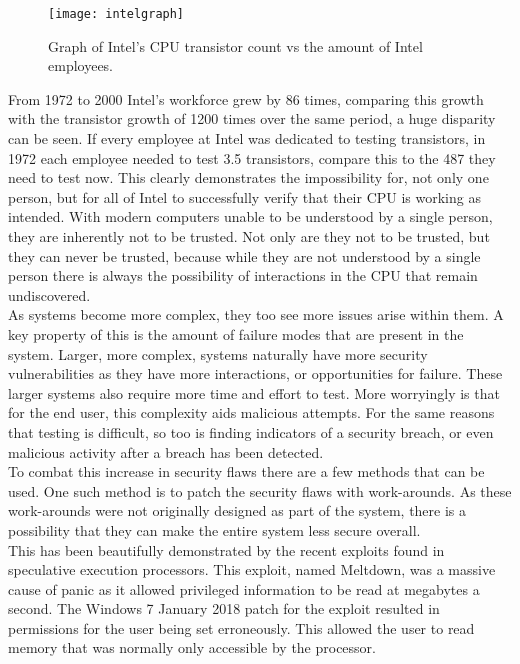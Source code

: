 \begin{figure}
  \centering
  \texttt{[image: intelgraph]}
  \caption{Graph of Intel's CPU transistor count vs the amount of Intel employees.\\ \cite{Reference28}\cite{Reference29}\cite{Reference30}\cite{Reference31}\cite{Reference32}\cite{Reference33}\cite{Reference34}\cite{Reference35}
}
  \label{fig:intelgraph}
\end{figure}

From 1972 to 2000 Intel’s workforce grew by 86 times, comparing this growth with the transistor growth of 1200 times over the same period, a huge disparity can be seen. If every employee at Intel was dedicated to testing transistors, in 1972 each employee needed to test 3.5 transistors, compare this to the 487 they need to test now. This clearly demonstrates the impossibility for, not only one person, but for all of Intel to successfully verify that their CPU is working as intended. With modern computers unable to be understood by a single person, they are inherently not to be trusted.\cite{Reference4} Not only are they not to be trusted, but they can never be trusted, because while they are not understood by a single person there is always the possibility of interactions in the CPU that remain undiscovered.\cite{Reference5}\\
 As systems become more complex, they too see more issues arise within them. A key property of this is the amount of failure modes that are present in the system. Larger, more complex, systems naturally have more security vulnerabilities as they have more interactions, or opportunities for failure.\cite{Reference6} These larger systems also require more time and effort to test. More worryingly is that for the end user, this complexity aids malicious attempts.\cite{Reference7} For the same reasons that testing is difficult, so too is finding indicators of a security breach, or even malicious activity after a breach has been detected.\cite{Reference8}\\
To combat this increase in security flaws there are a few methods that can be used. One such method is to patch the security flaws with work-arounds. As these work-arounds were not originally designed as part of the system, there is a possibility that they can make the entire system less secure overall.\\ 
This has been beautifully demonstrated by the recent exploits found in speculative execution processors. This exploit, named Meltdown, was a massive cause of panic as it allowed privileged information to be read at megabytes a second. The Windows 7 January 2018 patch for the exploit resulted in permissions for the user being set erroneously. This allowed the user to read memory that was normally only accessible by the processor.\cite{Reference9}\\
